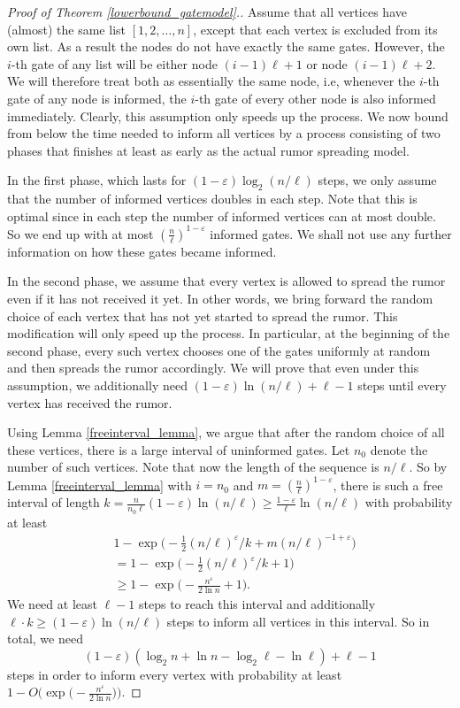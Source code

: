 \documentclass{article}
\begin{document}
\begin{proof}[Proof of Theorem \ref{lowerbound_gatemodel}.]
Assume that all vertices have (almost) the same list $[1,2,\dots,n]$, except that each vertex is excluded from its own list. As a result the nodes do not have exactly the same gates. However, the $i$-th gate of any list will be either node $(i-1)\ell+1$ or node $(i-1)\ell+2$. We will therefore treat both as essentially the same node, i.e, whenever the $i$-th gate of any node is informed, the $i$-th gate of every other node is also informed immediately.  
Clearly, this assumption only speeds up the process.
We now bound from below the time needed to inform all vertices by a process consisting of two phases that finishes at least as early as the actual rumor spreading model.

In the first phase, which lasts for $(1-\varepsilon) \log_2 (n/\ell)$ steps, we only assume that the number of informed vertices doubles in each step. Note that this is optimal since in each step the number of informed vertices can at most double. So we end up with at most $(\frac{n}{\ell})^{1-\varepsilon}$ informed gates. We shall not use any further information on how these gates became informed. 

In the second phase, we assume that every vertex is allowed to spread the rumor even if it has not received it yet. In other words, we bring forward the random choice of each vertex that has not yet started to spread the rumor. This modification will only speed up the process. In particular, at the beginning of the second phase, every such vertex chooses one of the gates uniformly at random and then spreads the rumor accordingly. We will prove that even under this assumption, we additionally need $(1-\varepsilon)\ln (n/\ell) + \ell-1$ steps until every vertex has received the rumor. 

Using Lemma \ref{freeinterval_lemma}, we argue that after the random choice of all these vertices, there is a large interval of uninformed gates. Let $n_0$ denote the number of such vertices.  Note that now the length of the sequence is $n/\ell$. So by Lemma \ref{freeinterval_lemma} with $i = n_0$ and $m = (\frac{n}{\ell})^{1-\varepsilon}$, there is such a free interval of length $k = \frac{n}{n_0 \ell}(1-\varepsilon)\ln (n/\ell) \geq \tfrac{1-\varepsilon}{\ell}\ln (n/\ell)$
with probability at least 
\begin{align*}
&1-\exp\bigl(-\tfrac{1}{2}(n/\ell)^{\varepsilon}/k +m(n/\ell)^{-1+\varepsilon}\bigr) \\
&= 1-\exp\bigl(-\tfrac{1}{2}(n/\ell)^{\varepsilon}/k +1\bigr)\\
&\geq 1-\exp\bigl(-\tfrac{n^{\varepsilon}}{2\ln n} +1\bigr).
\end{align*}
We need at least $\ell-1$ steps to reach this interval and additionally $\ell \cdot k \geq (1-\varepsilon)\ln (n/\ell)$ steps to inform all vertices in this interval. So in total, we need
\begin{equation}
 (1-\varepsilon) (\log_2 n + \ln n - \log_2 \ell - \ln \ell)+\ell-1
\end{equation}
steps in order to inform every vertex with probability at least $1-O\bigl(\exp\bigl(-\frac{n^{\varepsilon}}{2\ln n}\bigr)\bigr)$.\end{proof}


\end{document}
